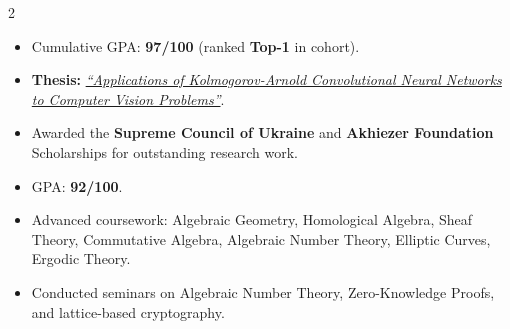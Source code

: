 \documentclass[10pt,a4paper,ragged2e]{maltacv}
\begin{document}

\bio{}

\makecvheader

\medskip
\begin{multicols}{2}

  \begin{itemize}
      \item Cumulative GPA: \textbf{97/100} (ranked \textbf{Top-1} in cohort).
      \item \textbf{Thesis:} \href{https://ekhnuir.karazin.ua/items/572c557e-8cb2-4b36-9c8d-e29cc8618e02}{\textit{``Applications of Kolmogorov-Arnold Convolutional Neural Networks to Computer Vision Problems''}}.
      \item Awarded the \textbf{Supreme Council of Ukraine} and \textbf{Akhiezer Foundation} Scholarships for outstanding research work.
  \end{itemize}

  \vfill\null
  \columnbreak

  \begin{itemize}
      \item GPA: \textbf{92/100}.
      \item Advanced coursework: Algebraic Geometry, Homological Algebra, Sheaf Theory, Commutative Algebra, Algebraic Number Theory, Elliptic Curves, Ergodic Theory.
      \item Conducted seminars on Algebraic Number Theory, Zero-Knowledge Proofs, and lattice-based cryptography.
  \end{itemize}
\end{multicols}
\end{document}
